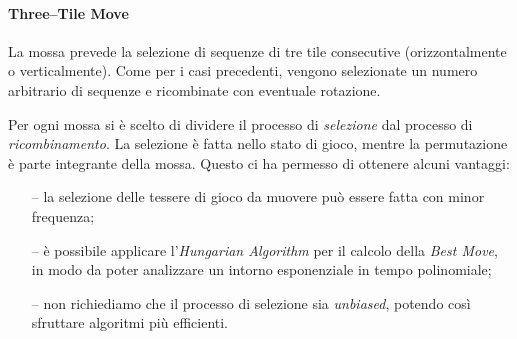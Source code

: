     \paragraph{Three--Tile Move} %
    \label{par:three_tile_move}

        La mossa prevede la selezione di sequenze di tre tile consecutive (orizzontalmente o verticalmente). Come per i casi precedenti, vengono selezionate un numero arbitrario di sequenze e ricombinate con eventuale rotazione.
    

    Per ogni mossa si è scelto di dividere il processo di \emph{selezione} dal processo di \emph{ricombinamento}. La selezione è fatta nello stato di gioco, mentre la permutazione è parte integrante della mossa. Questo ci ha permesso di ottenere alcuni vantaggi:
    \begin{itemize}
        \item[--] la selezione delle tessere di gioco da muovere può essere fatta con minor frequenza;
        \item[--] è possibile applicare l'\emph{Hungarian Algorithm} per il calcolo della \emph{Best Move}, in modo da poter analizzare un intorno esponenziale in tempo polinomiale;
        \item[--] non richiediamo che il processo di selezione sia \emph{unbiased}, potendo così sfruttare algoritmi più efficienti.
    \end{itemize}
    
